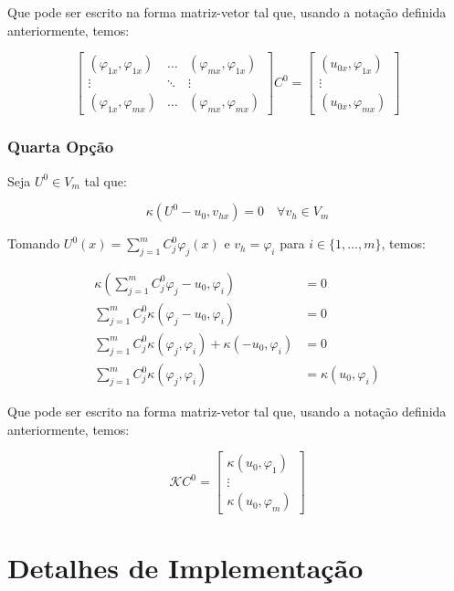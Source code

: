   Que pode ser escrito na forma matriz-vetor tal que, usando a notação definida anteriormente, temos:

  \[\begin{bmatrix}
    (\varphi_{1x}, \varphi_{1x}) & \dots & (\varphi_{mx}, \varphi_{1x}) \\
    \vdots & \ddots &\vdots \\
    (\varphi_{1x}, \varphi_{mx}) & \dots & (\varphi_{mx}, \varphi_{mx})
  \end{bmatrix}
  C^0 =
  \begin{bmatrix}
    (u_{0x}, \varphi_{1x}) \\ \vdots \\ (u_{0x}, \varphi_{mx})
  \end{bmatrix}\]

\subsection{Quarta Opção}

  Seja $U^0 \in V_m$ tal que:

  \[\kappa(U^0 - u_0, v_{hx}) = 0 \quad \forall v_h \in V_m\]

  Tomando $U^0(x) = \displaystyle\sum_{j=1}^{m} C^0_j \varphi_j(x)$ e $v_h = \varphi_i$ para $i \in \{1,\dots,m\}$, temos:

  \begin{align*}
    \kappa(\sum_{j=1}^{m} C^0_j \varphi_j - u_0, \varphi_i) &= 0 \\
    \sum_{j=1}^{m} C^0_j \kappa(\varphi_j - u_0, \varphi_i) &= 0 \\
    \sum_{j=1}^{m} C^0_j \kappa(\varphi_j, \varphi_i) + \kappa(- u_0, \varphi_i) &= 0 \\
    \sum_{j=1}^{m} C^0_j \kappa(\varphi_j, \varphi_i) &= \kappa(u_0, \varphi_i)
  \end{align*}

  Que pode ser escrito na forma matriz-vetor tal que, usando a notação definida anteriormente, temos:

  \[\mathcal{K}C^0 = \begin{bmatrix} \kappa(u_0, \varphi_1) \\ \vdots \\ \kappa(u_0, \varphi_m) \end{bmatrix}\]


\chapter{Detalhes de Implementação}

